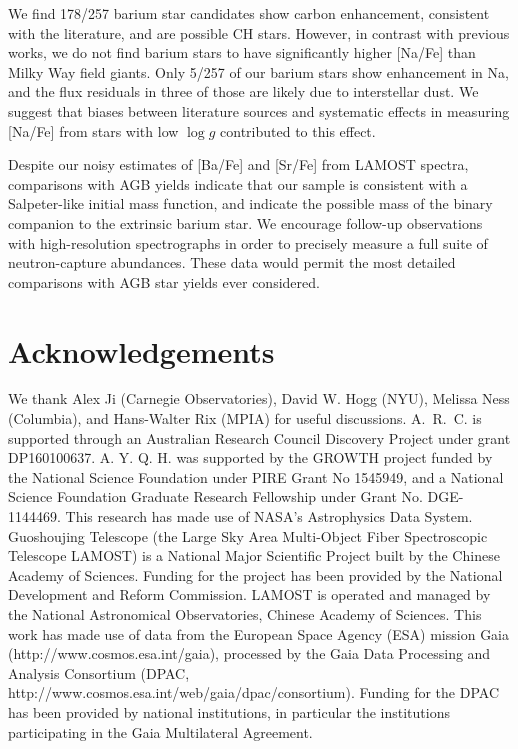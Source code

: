 \documentclass[a4paper,fleqn,usenatbib]{mnras}
\begin{document}
We find 178/257 barium star candidates show carbon enhancement, consistent with the literature, and are possible CH stars. However, in contrast with previous works, we do not find barium stars to have significantly higher [Na/Fe] than Milky Way field giants. Only 5/257 of our barium stars show enhancement in Na, and the flux residuals in three of those are likely due to interstellar dust. We suggest that biases between literature sources and systematic effects in measuring [Na/Fe] from stars with low $\log{g}$ contributed to this effect. 

Despite our noisy estimates of [Ba/Fe] and [Sr/Fe] from LAMOST spectra, comparisons with AGB yields indicate that our sample is consistent with a Salpeter-like initial mass function, and indicate the possible mass of the binary companion to the extrinsic barium star. We encourage follow-up observations with high-resolution spectrographs in order to precisely measure a full suite of neutron-capture abundances. These data would permit the most detailed comparisons with AGB star yields ever considered.

 

\section*{Acknowledgements}
We thank  Alex Ji (Carnegie Observatories), David W. Hogg (NYU), Melissa Ness (Columbia), and Hans-Walter Rix (MPIA) for useful discussions. 
A.~R.~C. is supported through an Australian Research Council Discovery Project under grant DP160100637.
A. Y. Q. H. was supported by the GROWTH project funded by the National Science Foundation under PIRE Grant No 1545949, and a National Science Foundation Graduate Research Fellowship under Grant No. DGE-1144469. 
This research has made use of NASA's Astrophysics Data System.
Guoshoujing Telescope (the Large Sky Area Multi-Object Fiber Spectroscopic Telescope LAMOST) is a National Major Scientific Project built by the Chinese Academy of Sciences. Funding for the project has been provided by the National Development and Reform Commission. LAMOST is operated and managed by the National Astronomical Observatories, Chinese Academy of Sciences. 
This work has made use of data from the European Space Agency (ESA) mission Gaia (http://www.cosmos.esa.int/gaia), processed by the Gaia Data Processing and Analysis Consortium (DPAC, http://www.cosmos.esa.int/web/gaia/dpac/consortium). Funding for the DPAC has been provided by national institutions, in particular the institutions participating in the Gaia Multilateral Agreement.
\end{document}
